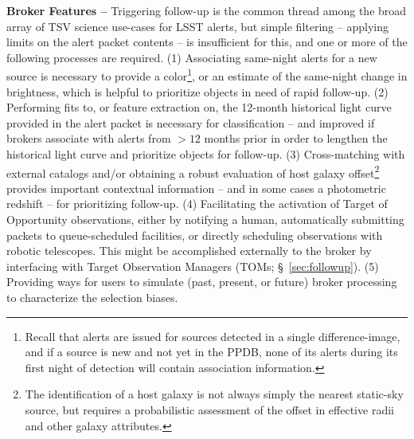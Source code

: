 
{\bf  {Broker} Features --}
Triggering follow-up is the common thread among the broad array of TSV science use-cases for  {LSST} alerts, but simple filtering -- applying limits on the alert packet contents -- is insufficient for this, and one or more of the following processes are required.
(1) Associating same-night alerts for a new source is necessary to provide a color\footnote{Recall that alerts are issued for sources detected in a single difference-image, and if a source is new and not yet in the  {PPDB}, none of its alerts during its first night of detection will contain association information.}, or an estimate of the same-night change in brightness, which is helpful to prioritize objects in need of rapid follow-up.
(2) Performing fits to, or feature extraction on, the 12-month historical light curve provided in the alert packet is necessary for classification -- and improved if brokers associate with alerts from $>12$ months prior in order to lengthen the historical light curve and prioritize objects for follow-up.
(3) Cross-matching with external catalogs and/or obtaining a robust evaluation of host galaxy offset\footnote{The identification of a host galaxy is not always simply the nearest static-sky source, but requires a probabilistic assessment of the offset in effective radii and other galaxy attributes.} provides important contextual information -- and in some cases a  {photometric redshift} -- for prioritizing follow-up.
(4) Facilitating the activation of Target of  {Opportunity} observations, either by notifying a human, automatically submitting packets to queue-scheduled facilities, or directly scheduling observations with robotic telescopes.
This might be accomplished externally to the broker by interfacing with Target Observation Managers (TOMs; \S~\ref{sec:followup}).
(5) Providing ways for users to simulate (past, present, or future) broker processing to characterize the selection biases.

